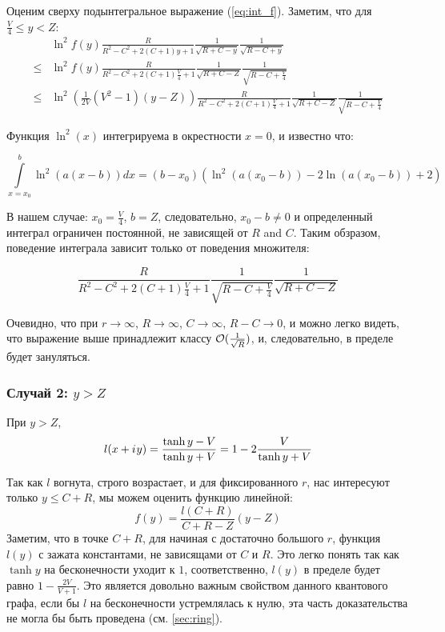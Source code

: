 Оценим сверху подынтегральное выражение (\ref{eq:int_f}). Заметим, что для $\frac{V}{4} \le y < Z$:
\begin{align*}
    & \ln^2 f(y) \frac{R}{R^2 - C^2 + 2 (C + 1) y + 1} \frac{1}{\sqrt{R + C - y}} \frac{1}{\sqrt{R - C + y}} 
\\ \le & \ln^2 f(y) \frac{R}{R^2 - C^2 + 2 (C + 1) \frac{V}{4} + 1} \frac{1}{\sqrt{R + C - Z}} \frac{1}{\sqrt{R - C + \frac{V}{4}}}
\\ \le & \ln^2 \left( \frac{1}{2 V}(V^2 - 1) (y - Z) \right) \frac{R}{R^2 - C^2 + 2 (C + 1) \frac{V}{4} + 1} \frac{1}{\sqrt{R + C - Z}} \frac{1}{\sqrt{R - C + \frac{V}{4}}}
\end{align*}

Функция $\ln^2(x)$ интегрируема в окрестности $x = 0$, и известно что: %

\[
\int\limits_{x=x_0}^b \ln^2(a (x - b)) dx = (b - x_0) (\ln^2(a (x_0 - b)) - 2 \ln(a (x_0 - b)) + 2)
\]

В нашем случае: $x_0 = \frac{V}{4}$, $b = Z$, следовательно, $x_0 - b \ne 0$ и определенный интеграл ограничен постоянной, не зависящей от $R$ and $C$. Таким обзразом, поведение интеграла зависит только от поведения множителя:

\[
\frac{R}{R^2 - C^2 + 2 (C + 1) \frac{V}{4} + 1} \frac{1}{\sqrt{R - C + \frac{V}{4}}} \frac{1}{\sqrt{R + C - Z}}
\]

Очевидно, что при $r \to \infty$, $R \to \infty$, $C \to \infty$, $R - C \to 0$, и можно легко видеть, что выражение выше принадлежит классу $\mathcal{O}(\frac{1}{\sqrt{R}})$, и, следовательно, в пределе будет зануляться.

\subsubsection{Случай 2: $y > Z$}
При $y > Z$, 
\[
l(x + {i\mkern1mu} y) 
 = \frac{\tanh y - V}{\tanh y + V}
 = 1 - 2 \frac{V}{\tanh y + V}
\]

Так как $l$ вогнута, строго возрастает, и для фиксированного $r$, нас интересуют только $y \le C + R$, мы можем оценить функцию линейной: 
\[
f(y) = \frac{l(C + R)}{C + R - Z} (y - Z)
\]
Заметим, что в точке $C + R$, для начиная с достаточно большого $r$, функция $l(y)$ с зажата константами, не зависящами от $C$ и $R$. Это легко понять так как $\tanh y$ на бесконечности уходит к $1$, соответственно, $l(y)$ в пределе будет равно $1 - \frac{2 V}{V + 1}$. Это является довольно важным свойством данного квантового графа, если бы $l$ на бесконечности устремлялась к нулю, эта часть доказательства не могла бы быть проведена (см. \autoref{sec:ring}).


